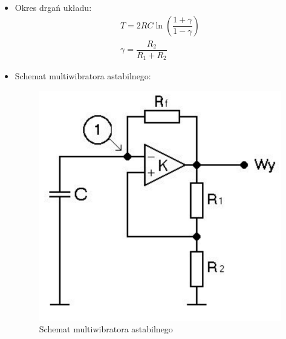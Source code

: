\begin{itemize}
    \item Okres drgań układu:
        \begin{align}
            \label{eq:multiwibrator_okres_drgań} T = 2RC\ln({\dfrac{1+\gamma}{1-\gamma}}) \\
            \label{eq:multiwibrator_gamma} \gamma = \dfrac{R_2}{R_1+R_2}
        \end{align}
    \item Schemat multiwibratora astabilnego:
        \begin{figure}[H]
            \centering
            \includegraphics[scale=0.4]{img/schemes/multiwibrator.png}
            \caption{Schemat multiwibratora astabilnego}
            \label{fig:schemat_multiwibratora}
        \end{figure}
\end{itemize}